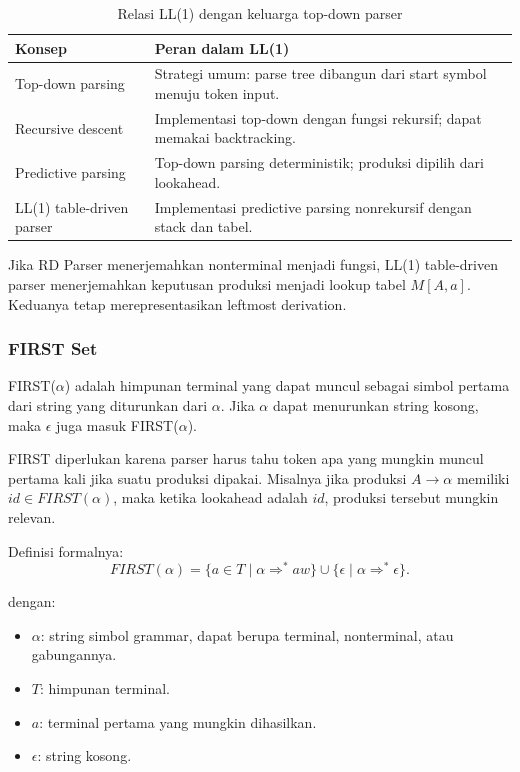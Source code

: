 \begin{table}[H]
\centering
\begin{tabularx}{\textwidth}{|L{0.25\textwidth}|X|}
\hline
\textbf{Konsep} & \textbf{Peran dalam LL(1)} \\
\hline
Top-down parsing & Strategi umum: parse tree dibangun dari start symbol menuju token input. \\
\hline
Recursive descent & Implementasi top-down dengan fungsi rekursif; dapat memakai backtracking. \\
\hline
Predictive parsing & Top-down parsing deterministik; produksi dipilih dari lookahead. \\
\hline
LL(1) table-driven parser & Implementasi predictive parsing nonrekursif dengan stack dan tabel. \\
\hline
\end{tabularx}
\caption{Relasi LL(1) dengan keluarga top-down parser}
\label{tab:relasi-ll1-topdown}
\end{table}

Jika RD Parser menerjemahkan nonterminal menjadi fungsi, LL(1) table-driven parser menerjemahkan keputusan produksi menjadi lookup tabel $M[A,a]$. Keduanya tetap merepresentasikan leftmost derivation.

\subsubsection{FIRST Set}

\begin{jawab}
FIRST($\alpha$) adalah himpunan terminal yang dapat muncul sebagai simbol pertama dari string yang diturunkan dari $\alpha$. Jika $\alpha$ dapat menurunkan string kosong, maka $\epsilon$ juga masuk FIRST($\alpha$).
\end{jawab}

FIRST diperlukan karena parser harus tahu token apa yang mungkin muncul pertama kali jika suatu produksi dipakai. Misalnya jika produksi $A\rightarrow \alpha$ memiliki $id\in FIRST(\alpha)$, maka ketika lookahead adalah $id$, produksi tersebut mungkin relevan.

Definisi formalnya:
\[
    FIRST(\alpha)=\{a\in T \mid \alpha \Rightarrow^* aw\}\cup\{\epsilon \mid \alpha\Rightarrow^*\epsilon\}.
\]

dengan:
\begin{itemize}
    \item $\alpha$: string simbol grammar, dapat berupa terminal, nonterminal, atau gabungannya.
    \item $T$: himpunan terminal.
    \item $a$: terminal pertama yang mungkin dihasilkan.
    \item $\epsilon$: string kosong.
\end{itemize}

